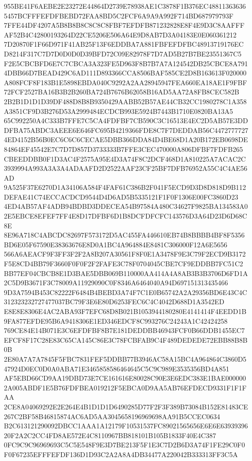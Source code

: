 \documentclass[UTF8,fontset=fandol,zihao=-4,a4paper]{ctexart}
\begin{document}
{{955BE41F6AEBE2E23272E44864D2739E78938AE1C3878F1B376EC488113636365457BCFFFEFDFBEBD72FAA8BD5C2FCF6A9A9A992F714BD687979793F
7FFE44DF4207A5B8B8B8C8C8C8FBF7EFDFB871232828E8F4E9D3C8AAFFFAF52B4C42800193264D22CE5206E506A64E9D8AB7D3A04183E0E060361212
7D20870F1F66D971F41AB25F13F6EDDBA7A881FBFEFDFBC48913719176ECD8214F317C7D7D0D0D0D39BFD72C09E82978F7D7AD5B27B7BE23551367C5
F2E5CBCBFD6E7C7CBCA3A323FE5D963F8B7B7A7A124542DB25CBCE8A7914DBB66D7BEAD429C6AD111D893366CCA8506BAF585CE2D8B163613F020000
A808FCF8F183B1E5898EBDA040C9292A2AA28945947FEA660EA18AE1F9FBF72FCF2527BA16B3B2B260BA724B7676B62058B16AD5AA72A8FB8CEC582B
2B2B1D1D1D39DF488D8B8B9350429AABB52B57AE44CB32CC1980278C1A358A3851CF9D3B276D53A2999484ECDCB993E5924B7443B1710E0820BA13A5
65C992250A4C333B7FFE7C5CA4FDFBF7CB590C3C16513E4EC2D5AB57E3DDDFBA75ABDC3AEEE6E646FC695B4219366FDE8C7F7DEDDAB56C4472777727
4ED4152B56B0EC6C6C6CECAE5DBB366DDA84D4BE68D1A20B172EB0698DE84864EF45542E7C7D7D857D3733333B7FFE3CEC470000A806DFBF7FDFB265
CBEEDDBB0F1D3AC4F2575A95E4D3A74F8C2DCF468D1A810225A7ACAC2C3939994A993A3A3A4ADAAFD2D2522AAF23CF25BF7DFB76952A55C4C4AE56AD
9A525F37E6270D1A34106A584F4FAF61C386B2F041F5ECD9D3D8D818D9B112DEFAE41C74ECCACDCD9544D4D6AD5B5335121F1F0F1306E00FC3860D23
4ED4AB57AF4ADB94BDBD3DDECEA54B97584A480C34627F9825BA134583A02E5EBCE8EFEF7FF4E8D17DFBF6D1B8DCFDFCFC143576D3A64D23D6D68C8E
8E96A718C4ABCDC82697F573172D5AC455FA446610EB74B8BBBB4BF8F5356BD6E05F67590E38363676E8D0A1BC4A964884E8481C306000F12A6E5656
566A6AEACF9F3FF3F2F2A8B207A30561F8F0E1A3478F9E3C79F2ECD9B3172F5E8CD4BB79F3660F0F0F2F2FAFE3C78F0704045CBE7CF9EDDBB7FC51C2
BB77EF04CBCB8E1D3BAE5DBB069B110000AA414A4A8AB3B3B3706D6FD1A2C5D9B3671F3C78009A11929090C0F8346A6464040A94D697151313435466
9D3A7594B453C82222F6484B4BEBD3A74F7C1E0B65742A2A29356BD6E43C4C312323232727477037BC79F3E6E80D6253FEC6C4C4042D688D1A3542ED
E8E8E8306E4AC2ABA93F7EFC68D8B021B1053944180280E4141414F4EEDD1B9FA877EFDE95B6A9418306E1ED346EDCF8C993276C24243A1C42424258
769CE84E14B071E3C6EFDFBF8B7E181DEDDBB46943FCF0B66DDB1455EC7EFCF8F17C28E83C65CA145C86E3C78FCBFAB9C4F489DEDEDE72EBB88B8B0B
2E80A7A7A7845F5FBC7831FEF5DDBB77B3946AC58A15BC4A964864C3860D547924D0EC0D0A0ABA71E3465858586464645C5C9C989E3535356BD4A851
AF5EBD66CD9AA19DBD73E7CE161616E80028C90E3E6EDC383E1BAE0000002A005ABDF1E5B76FDFBEA019212F5EBCA0D9AA5AB76EFDECD9331F1F1FAA
2CE8A04069292E2E264E4B1D1D1D6490285D77F2F3F389B73084B152E81483CE267C2BF58B46815874AC6AD5AA3045658196969698AA91B5CCEC0634
B2C613121290092DBCC1AAA1A12179F10531537FC89021565656E6E6E6393939620F2A2C2CC4FD8AE572E4C8110967BB818101B105B1833F40E4C387
0FC9C9C96969693C5C5E548F9E3D7BE213F5F1E3C7D2B6D3A74F1FE29C0F0F0F67235EFFFEFDF136D1D93C2A2A8A4DB34477A220042B333313FF3C5A
}}
\end{document}

